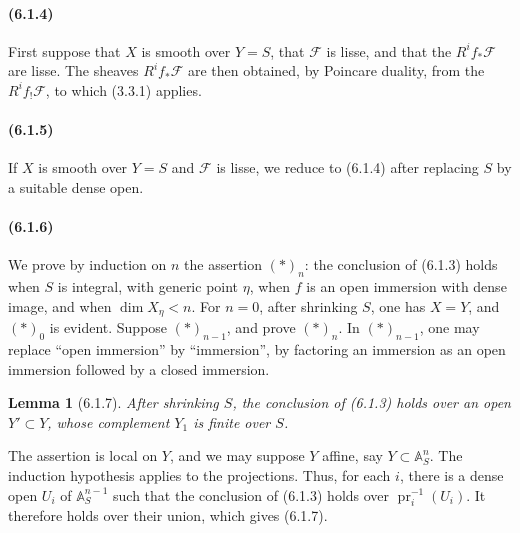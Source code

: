 \documentclass[11pt]{article}
\newtheorem{lemma}{Lemma}
\theoremstyle{remark}
\begin{document}
\paragraph{(6.1.4)}
First suppose that \(X\) is smooth over \(Y=S\), that \(\mathcal F\) is lisse, and that the \(R^if_*\mathcal F\) are lisse.  The sheaves \(R^if_*\mathcal F\) are then obtained, by Poincare duality, from the \(R^if_!\mathcal F\), to which (3.3.1) applies.

\paragraph{(6.1.5)}
If \(X\) is smooth over \(Y=S\) and \(\mathcal F\) is lisse, we reduce to (6.1.4) after replacing \(S\) by a suitable dense open.

\paragraph{(6.1.6)}
We prove by induction on \(n\) the assertion \((*)_n\): the conclusion of (6.1.3) holds when \(S\) is integral, with generic point \(\eta\), when \(f\) is an open immersion with dense image, and when \(\dim X_\eta<n\).  For \(n=0\), after shrinking \(S\), one has \(X=Y\), and \((*)_0\) is evident.  Suppose \((*)_{n-1}\), and prove \((*)_n\).  In \((*)_{n-1}\), one may replace ``open immersion'' by ``immersion'', by factoring an immersion as an open immersion followed by a closed immersion.

\begin{lemma}[6.1.7]
After shrinking \(S\), the conclusion of (6.1.3) holds over an open \(Y'\subset Y\), whose complement \(Y_1\) is finite over \(S\).
\end{lemma}

The assertion is local on \(Y\), and we may suppose \(Y\) affine, say \(Y\subset \mathbb A^n_S\).  The induction hypothesis applies to the projections.  Thus, for each \(i\), there is a dense open \(U_i\) of \(\mathbb A^{n-1}_S\) such that the conclusion of (6.1.3) holds over \(\operatorname{pr}_i^{-1}(U_i)\).  It therefore holds over their union, which gives (6.1.7).
\end{document}
